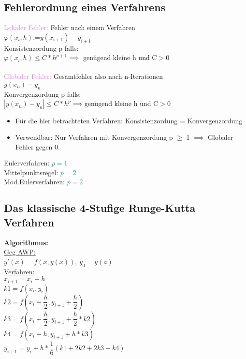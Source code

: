 \documentclass[../ZF_HM2.tex]{subfiles}
\begin{document}
\subsection{Fehlerordnung eines Verfahrens}

\textcolor{violet}{Lokaler Fehler:} Fehler nach einem Verfahren\\
\colorbox{yellow!30}{$\varphi(x_i,h)$:=$y(x_{i+1})-y_{i+1}$}\\
\colorbox{green!30}{Konsistenzordung p} falls:\\
$\varphi(x_i,h) \leq C * h^{p+1} \implies$ genügend kleine h und C$>$0\\\\
\textcolor{violet}{Globaler Fehler:} Gesamtfehler also nach n-Iterationen\\
\colorbox{yellow!30}{$y(x_n)-y_n$}\\
\colorbox{green!30}{Konvergenzordung p} falls:\\
$|y(x_n)-y_n| \leq C*h^p \implies$genügend kleine h und C$>$0\\
\begin{itemize}
	\item Für die hier betrachteten Verfahren: Konsistenzordung = Konvergenzordung
	\item Verwendbar: Nur Verfahren mit Konvergenzordung p $\geq$ 1 $\implies$ Globaler Fehler gegen 0.
\end{itemize}
Eulerverfahren: \textcolor{teal}{$p=1$}\\
Mittelpunktsregel: \textcolor{teal}{$p=2$}\\
Mod.Eulerverfahren: \textcolor{teal}{$p=2$}\\

\subsection{Das klassische 4-Stufige Runge-Kutta Verfahren}
\begin{mdframed}
\textbf{Algorithmus:\\}
\underline{Geg AWP:}\\
$y'(x) = f(x,y(x))$, $y_0 = y(a)$\\
\underline{Verfahren:}\\
$x_{i+1}= x_i + h$\\
$k1 = f(x_i,y_i)$\\
$k2 = f(x_i+\dfrac{h}{2}, y_{i+1}+\dfrac{h}{2})$\\
$k3 = f(x_i+\dfrac{h}{2}, y_{i+1}+\dfrac{h}{2}*k2)$\\
$k4 = f(x_i+h, y_{i+1}+h*k3)$\\
$y_{i+1} = y_i + h*\dfrac{1}{6}(k1+2k2+2k3+k4)$

\end{mdframed}
\end{document}
